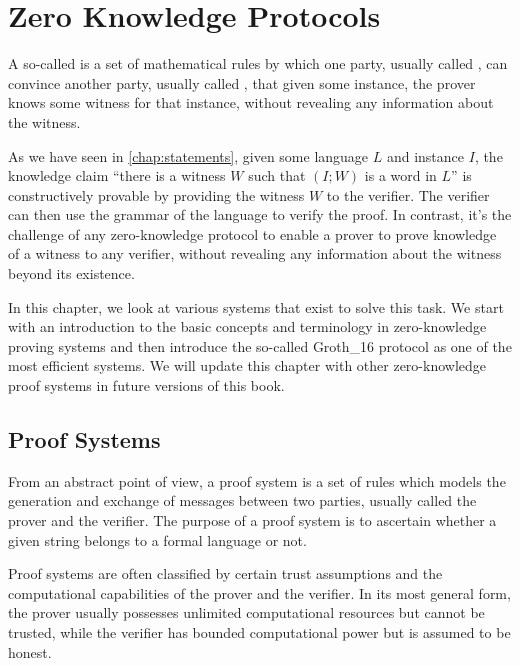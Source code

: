 \chapter{Zero Knowledge Protocols}
\label{chapter:zk-protocols}
A so-called  is a set of mathematical rules by which one party, usually called , can convince another party, usually called , that given some instance, the prover knows some witness for that instance, without revealing any information about the witness. 

As we have seen in \chaptname{} \ref{chap:statements}, given some language $L$ and instance $I$, the knowledge claim ``there is a witness $W$ such that  $(I;W)$ is a word in $L$'' is constructively provable by providing the witness $W$ to the verifier. The verifier can then use the grammar of the language to verify the proof. In contrast, it's the challenge of any zero-knowledge protocol to enable a prover to prove knowledge of a witness to any verifier, without revealing any information about the witness beyond its existence.

In this chapter, we look at various systems that exist to solve this task. We start with an introduction to the basic concepts and terminology in zero-knowledge proving systems and then introduce the so-called Groth\_16 protocol as one of the most efficient systems. We will update this chapter with other zero-knowledge proof systems in future versions of this book.

\section{Proof Systems}
From an abstract point of view, a proof system is a set of rules which models the generation and exchange of messages between two parties, usually called the prover and the verifier. The purpose of a proof system is to ascertain whether a given string belongs to a formal language or not.  

Proof systems are often classified by certain trust assumptions and the computational capabilities of the prover and the verifier. In its most general form, the prover usually possesses unlimited computational resources but cannot be trusted, while the verifier has bounded computational power but is assumed to be honest.

